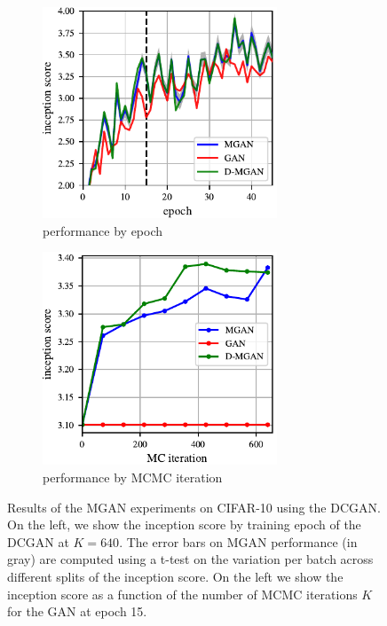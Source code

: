 \documentclass{article}
\begin{document}
\begin{figure}
    \centering
    \begin{subfigure}[b]{0.49\textwidth}
       \centering
       \includegraphics[width=2.75in]{figures/base_iso.pdf}
       \caption{performance by epoch}
       \label{fig:incep_by_epoch}
    \end{subfigure}
    \begin{subfigure}[b]{0.49\textwidth}
       \centering
       \includegraphics[width=2.75in]{figures/plot_per_mh.pdf}
       \caption{performance by MCMC iteration}
       \label{fig:incep_by_iter}
    \end{subfigure}
    \caption{{\small
    Results of the MGAN experiments on CIFAR-10 using the DCGAN\@.
    On the left, we show the inception score by training epoch of the DCGAN at $K=640$.
    The error bars on MGAN performance (in gray) are computed using a t-test on the variation per batch across different splits of the inception score.
    On the left we show the inception score as a function of the number of MCMC iterations $K$ for the GAN at epoch 15.
    }}
\end{figure}

\end{document}
